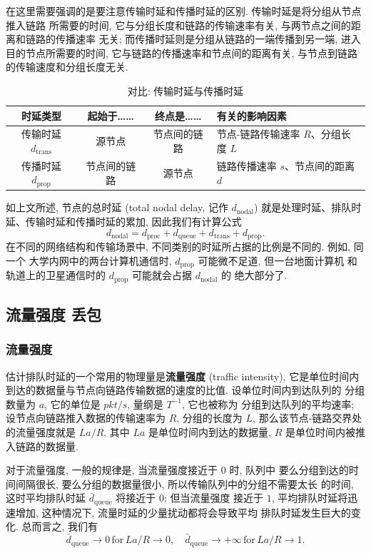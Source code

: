 \documentclass[10pt,UTF8]{book} %
\begin{document}
在这里需要强调的是要注意传输时延和传播时延的区别. 传输时延是将分组从节点推入链路
所需要的时间, 它与分组长度和链路的传输速率有关, 与两节点之间的距离和链路的传播速率
无关; 而传播时延则是分组从链路的一端传播到另一端, 进入目的节点所需要的时间,
它与链路的传播速率和节点间的距离有关, 与节点到链路的传输速度和分组长度无关.
\begin{table}[H]
    \centering
    \caption{对比: 传输时延与传播时延}
    \begin{tabular}{cccp{}}
        \hline
        \textbf{时延类型} & \textbf{起始于……} & \textbf{终点是……} & \textbf{有关的影响因素} \\ 
        \hline
        传输时延 $d_\mathrm{trans}$ & 源节点 & 节点间的链路 & 节点-链路传输速率 $R$、分组长度 $L$ \\ 
        传播时延 $d_\mathrm{prop}$ & 节点间的链路 & 源节点 & 链路传播速率 $s$、节点间的距离 $d$ \\
        \hline
    \end{tabular}
\end{table}

如上文所述, 节点的总时延 (total nodal delay, 记作 $d_\mathrm{nodal}$)
就是处理时延、排队时延、传输时延和传播时延的累加,
因此我们有计算公式
\[ d_\mathrm{nodal} = d_\mathrm{proc}
+ d_\mathrm{queue} + d_\mathrm{trans} + d_\mathrm{prop}. \]
在不同的网络结构和传输场景中, 不同类别的时延所占据的比例是不同的. 例如, 同一个
大学内网中的两台计算机通信时, $d_\mathrm{prop}$ 可能微不足道, 但一台地面计算机
和轨道上的卫星通信时的 $d_\mathrm{prop}$ 可能就会占据 $d_\mathrm{nodal}$ 的
绝大部分了.

\subsection{流量强度 \quad 丢包}

\subsubsection{流量强度}

估计排队时延的一个常用的物理量是\textbf{流量强度} (traffic intensity),
它是单位时间内到达的数据量与节点向链路传输数据的速度的比值. 设单位时间内到达队列的
分组数量为 $a$, 它的单位是 $\si{pkt/s}$, 量纲是 $T^{-1}$, 它也被称为
分组到达队列的平均速率; 设节点向链路推入数据的传输速率为 $R$, 分组的长度为 $L$,
那么该节点-链路交界处的流量强度就是 $La/R$. 其中 $La$ 是单位时间内到达的数据量,
$R$ 是单位时间内被推入链路的数据量.

对于流量强度, 一般的规律是, {\kaishu 当流量强度接近于 $0$ 时, 队列中
要么分组到达的时间间隔很长, 要么分组的数据量很小, 所以传输队列中的分组不需要太长
的时间, 这时平均排队时延 $\bar{d}_\mathrm{queue}$ 将接近于 $0$; 但当流量强度
接近于 $1$, 平均排队时延将迅速增加, 这种情况下, 流量时延的少量扰动都将会导致平均
排队时延发生巨大的变化.}
总而言之, 我们有
\[ \bar{d}_\mathrm{queue} \to 0 \,  \text{for}  \, La/R \to 0, 
\quad \bar{d}_\mathrm{queue} \to +\infty \,  \text{for}  \, La/R \to 1. \]
\end{document}
